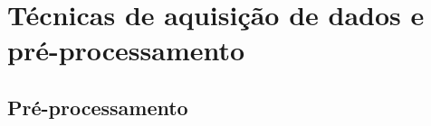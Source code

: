 \chapter{Técnicas de aquisição de dados e pré-processamento} 
\label{cap:dados_prep}


\section{Pré-processamento}